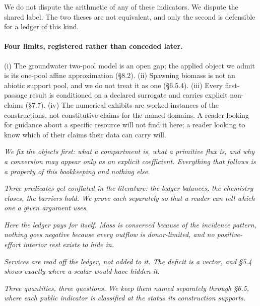 We do not dispute the arithmetic of any of these indicators. We dispute the
shared label. The two theses are not equivalent, and only the second is
defensible for a ledger of this kind.

\paragraph{Four limits, registered rather than conceded later.}
(i) The groundwater two-pool model is an open gap; the applied object we admit
is its one-pool affine approximation (\S8.2). (ii) Spawning biomass is not an
abiotic support pool, and we do not treat it as one (\S6.5.4). (iii) Every
first-passage result is conditioned on a declared surrogate and carries
explicit non-claims (\S7.7). (iv) The numerical exhibits are worked instances of
the constructions, not constitutive claims for the named domains. A reader
looking for guidance about a specific resource will not find it here; a reader
looking to know which of their claims their data can carry will.

\newcommand{\preface}[1]{\emph{#1}\par\smallskip}

\preface{We fix the objects first: what a compartment is, what a primitive flux
is, and why a conversion may appear only as an explicit coefficient. Everything
that follows is a property of this bookkeeping and nothing else.}   %

\preface{Three predicates get conflated in the literature: the ledger balances,
the chemistry closes, the barriers hold. We prove each separately so that a
reader can tell which one a given argument uses.}                   %

\preface{Here the ledger pays for itself. Mass is conserved because of the
incidence pattern, nothing goes negative because every outflow is
donor-limited, and no positive-effort interior rest exists to hide in.}  %

\preface{Services are read off the ledger, not added to it. The deficit is a
vector, and \S5.4 shows exactly where a scalar would have hidden it.}  %

\preface{Three quantities, three questions. We keep them named separately through
\S6.5, where each public indicator is classified at the status its construction
supports.}                                                             %

